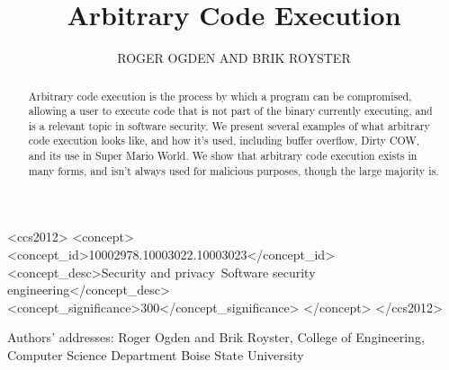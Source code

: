 \documentclass{acmsmall}
\begin{document}

\title{Arbitrary Code Execution}
\author{ROGER OGDEN AND BRIK ROYSTER}

\begin{abstract}
Arbitrary code execution is the process by which a program can be compromised, allowing a user to execute code that is not part of the binary currently executing, and is a relevant topic in software security. We present several examples of what arbitrary code execution looks like, and how it's used, including buffer overflow, Dirty COW, and its use in Super Mario World. We show that arbitrary code execution exists in many forms, and isn't always used for malicious purposes, though the large majority is.
\end{abstract}

%
%
\begin{CCSXML}
<ccs2012>
<concept>
<concept_id>10002978.10003022.10003023</concept_id>
<concept_desc>Security and privacy~Software security engineering</concept_desc>
<concept_significance>300</concept_significance>
</concept>
</ccs2012>
\end{CCSXML}


%
%




\begin{bottomstuff}
Authors' addresses: Roger Ogden and Brik Royster,
College of Engineering, Computer Science Department
Boise State University
\end{bottomstuff}

\maketitle













\nocite{*}


\end{document}
